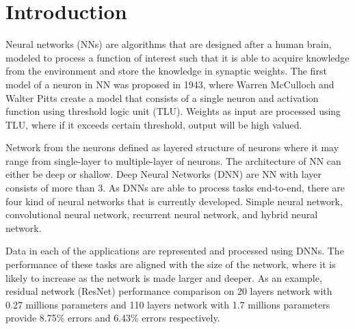 

    \chapter{Introduction}

    Neural networks (NNs) are algorithms that are designed after a human brain, modeled to process a function of interest such that it is able to acquire knowledge from the environment and store the knowledge in synaptic weights. The first model of a neuron in NN was proposed in 1943, where Warren McCulloch and Walter Pitts create a model that consists of a single neuron and activation function using threshold logic unit (TLU). Weights as input are processed using TLU, where if it exceeds certain threshold, output will be high valued.
    
    Network from the neurons defined as layered structure of neurons where it may range from single-layer to multiple-layer of neurons. The architecture of NN can either be deep or shallow. Deep Neural Networks (DNN) are NN with layer consists of more than 3. As DNNs are able to process tasks end-to-end, there are four kind of
    neural networks that is currently developed. Simple neural network, convolutional neural network, recurrent neural network, and hybrid neural network.
    
    Data in each of the applications are represented and processed using DNNs. The performance of these tasks are aligned with the size of the network, where it is likely to increase as the network is made larger and deeper. As an example, residual network (ResNet) performance comparison on 20 layers network with 0.27 millions parameters and 110 layers network with 1.7 millions parameters provide 8.75\% errors and 6.43\% errors respectively.
    
